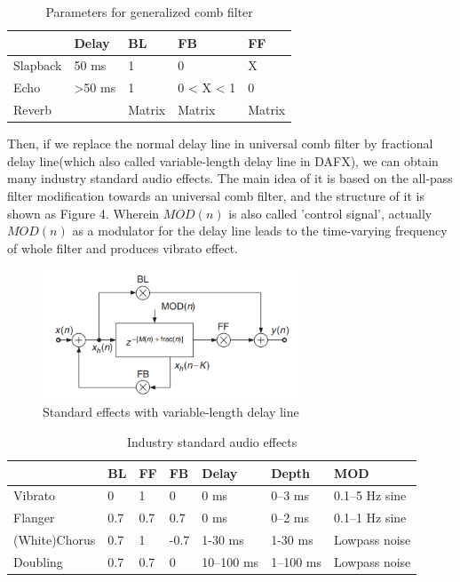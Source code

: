 \documentclass[a4paper]{tufte-handout} %
\begin{document}
\begin{table}[ht]
	\centering
	\selectfont
	\begin{tabular}{l l l l l}
		\toprule
		 & Delay & BL & FB & FF \\
		\midrule
		Slapback & 50 ms & 1 & 0 & X \\
		Echo & >50 ms & 1 & 0 < X < 1 & 0 \\
		Reverb &  & Matrix & Matrix & Matrix \\
		\bottomrule
	\end{tabular}
	\caption{Parameters for generalized comb filter}
	\label{tab:normaltab}
\end{table}

Then, if we replace the normal delay line in universal comb filter by fractional delay line(which also called variable-length delay line in DAFX), we can obtain many industry standard audio effects. The main idea of it is based on the all-pass filter modification towards an universal comb filter, and the structure of it is shown as Figure 4. Wherein $MOD(n)$ is also called 'control signal', actually $MOD(n)$ as a modulator for the delay line leads to the time-varying frequency of whole filter and produces vibrato effect.
\begin{figure}[h]
    \centering
	\includegraphics[width=3in]{Image/VariableDelayComb.png}
	\caption{Standard effects with variable-length delay line}
	\label{fig:textfig}
\end{figure}

\begin{table}[ht]
    \caption{Industry standard audio effects}
	\centering
	\selectfont
	\begin{tabular}{l l l l l l l}
		\toprule
		 & BL & FF & FB & Delay & Depth & MOD \\
		\midrule
		Vibrato & 0 & 1 & 0 & 0 ms & 0–3 ms & 0.1–5 Hz sine \\
		Flanger & 0.7 & 0.7 & 0.7 & 0 ms & 0–2 ms & 0.1–1 Hz sine \\
		(White)Chorus & 0.7 & 1 & -0.7 & 1-30 ms & 1-30 ms & Lowpass noise\\
		Doubling & 0.7 & 0.7 & 0 & 10–100 ms & 1–100 ms & Lowpass noise \\
		\bottomrule
	\end{tabular}
\end{table}
\end{document}
